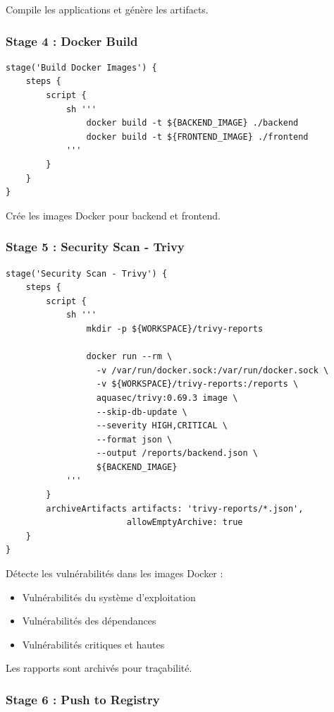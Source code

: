 \documentclass[12pt,a4paper]{report}
\begin{document}
Compile les applications et génère les artifacts.

\subsubsection{Stage 4 : Docker Build}

\begin{verbatim}
stage('Build Docker Images') {
    steps {
        script {
            sh '''
                docker build -t ${BACKEND_IMAGE} ./backend
                docker build -t ${FRONTEND_IMAGE} ./frontend
            '''
        }
    }
}
\end{verbatim}

Crée les images Docker pour backend et frontend.

\subsubsection{Stage 5 : Security Scan - Trivy}

\begin{verbatim}
stage('Security Scan - Trivy') {
    steps {
        script {
            sh '''
                mkdir -p ${WORKSPACE}/trivy-reports
                
                docker run --rm \
                  -v /var/run/docker.sock:/var/run/docker.sock \
                  -v ${WORKSPACE}/trivy-reports:/reports \
                  aquasec/trivy:0.69.3 image \
                  --skip-db-update \
                  --severity HIGH,CRITICAL \
                  --format json \
                  --output /reports/backend.json \
                  ${BACKEND_IMAGE}
            '''
        }
        archiveArtifacts artifacts: 'trivy-reports/*.json', 
                        allowEmptyArchive: true
    }
}
\end{verbatim}

Détecte les vulnérabilités dans les images Docker :
\begin{itemize}
    \item Vulnérabilités du système d'exploitation
    \item Vulnérabilités des dépendances
    \item Vulnérabilités critiques et hautes
\end{itemize}

Les rapports sont archivés pour traçabilité.

\subsubsection{Stage 6 : Push to Registry}
\end{document}
